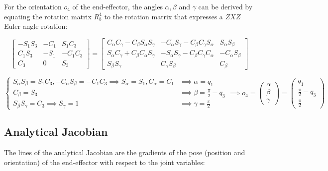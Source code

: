 For the orientation $o_4$ of the end-effector, the angles $\alpha,\beta$ and $\gamma$ can be derived by equating the rotation matrix $R_b^4$ to the rotation matrix that expresses a $ZXZ$ Euler angle rotation:

\begin{equation*}
\begin{bmatrix}
-S_1S_3 & -C_1 & S_1C_3\\
C_1S_3 & -S_1 & -C_1C_3\\
C_3 & 0 & S_3
\end{bmatrix}=\begin{bmatrix}
C_\alpha C_\gamma-C_\beta S_\alpha S_\gamma & -C_\alpha S_\gamma-C_\beta C_\gamma S_\alpha & S_\alpha S_\beta\\
S_\alpha C_\gamma+C_\beta C_\alpha S_\gamma & -S_\alpha S_\gamma-C_\beta C_\gamma C_\alpha & -C_\alpha S_\beta\\
S_\beta S_\gamma & C_\gamma S_\beta & C_\beta
\end{bmatrix}
\end{equation*}

\begin{equation*}
\begin{cases}
S_\alpha S_\beta = S_1C_3, -C_\alpha S_\beta = -C_1C_3 \implies S_\alpha=S_1,C_\alpha=C_1&\implies \alpha = q_1\\ 
C_\beta = S_3&\implies \beta = \frac{\pi}{2}-q_3\\
S_\beta S_\gamma = C_3\implies S_\gamma = 1&\implies \gamma = \frac{\pi}{2}
\end{cases}
\implies o_{4} = \begin{pmatrix}
\alpha\\\beta\\\gamma
\end{pmatrix}=\begin{pmatrix}
q_1\\\frac{\pi}{2}-q_3\\ \frac{\pi}{2}
\end{pmatrix}
\end{equation*}

\subsection{Analytical Jacobian}

The lines of the analytical Jacobian are the gradients of the pose (position and orientation) of the end-effector with respect to the joint variables:

